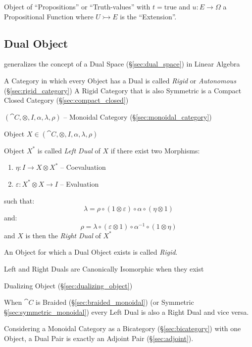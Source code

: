 Object of ``Propositions'' or ``Truth-values'' with $t =
\mathrm{true}$ and $u : E \rightarrow \Omega$ a Propositional Function
where $U \rightarrowtail E$ is the ``Extension''.



\subsection{Dual Object}\label{sec:dual_object}

generalizes the concept of a Dual Space (\S\ref{sec:dual_space}) in
Linear Algebra

A Category in which every Object has a Dual is called \emph{Rigid} or
\emph{Autonomous} (\S\ref{sec:rigid_category}) A Rigid Category that
is also Symmetric is a Compact Closed Category
(\S\ref{sec:compact_closed})

$(\cat{C}, \otimes, I, \alpha, \lambda, \rho)$ -- Monoidal Category
(\S\ref{sec:monoidal_category})

Object $X \in (\cat{C}, \otimes, I, \alpha, \lambda, \rho)$

Object $X^*$ is called \emph{Left Dual} of $X$ if there exist two
Morphisms:
\begin{enumerate}
  \item $\eta : I \rightarrow X \otimes X^*$ -- Coevaluation
  \item $\varepsilon : X^* \otimes X \rightarrow I$ -- Evaluation
\end{enumerate}
such that:
\[
  \lambda = \rho \circ (1 \otimes \varepsilon) \circ \alpha \circ
    (\eta \otimes 1)
\]
and:
\[
  \rho = \lambda \circ (\varepsilon \otimes 1) \circ \alpha^{-1}
    \circ (1 \otimes \eta)
\]
and $X$ is then the \emph{Right Dual} of $X^*$

An Object for which a Dual Object exists is called \emph{Rigid}.

Left and Right Duals are Canonically Isomorphic when they exist

Dualizing Object (\S\ref{sec:dualizing_object})

When $\cat{C}$ is Braided (\S\ref{sec:braided_monoidal}) (or Symmetric
\S\ref{sec:symmetric_monoidal}) every Left Dual is also a Right Dual
and vice versa.

Considering a Monoidal Category as a Bicategory
(\S\ref{sec:bicategory}) with one Object, a Dual Pair is exactly an
Adjoint Pair (\S\ref{sec:adjoint}).




